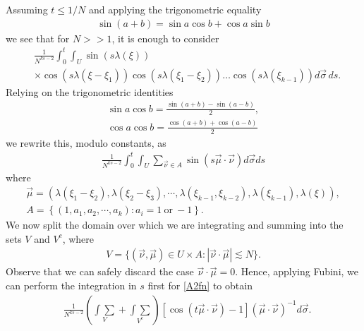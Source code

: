 \documentclass{amsart}
\begin{document}
Assuming $t \le 1/N$ and applying the trigonometric equality
\begin{equation*}
\begin{split}
\sin(a + b) = \sin a \cos b + \cos a \sin b
\end{split}
\end{equation*}
we see that for $N >> 1$, it is enough to consider
\begin{equation*}
\begin{split}
& \frac{1}{N^{ks-2}}\int_0^t 
\int_U
\sin(s\lambda(\xi))
\\
& \times 
\cos(s \lambda(\xi- \xi_{1}))
\cos(s \lambda(\xi_{1}- \xi_{2}))\dots\cos(s\lambda(\xi_{k-1}))
d \vec{\sigma}\,ds.
\end{split}
\end{equation*}
Relying on the trigonometric identities
\begin{gather*}
\sin a\cos b= \frac{\sin(a + b) - \sin(a-b)}{2},
\\
\cos a \cos b = \frac{\cos(a + b) + \cos(a-b)}{2}
\end{gather*}
we rewrite this, modulo constants, as
\begin{gather*}
  \frac{1}{N^{ks-2}} \int_{0}^{t}
  \int_{U}
\sum_{\vec{\nu} \in A}  \sin(s \vec{\mu} \cdot \vec{\nu}) d \vec{\sigma} ds
\end{gather*}
where
\begin{gather*}
  \vec{\mu} = \left ( \lambda(\xi_{1} - \xi_{2}), \lambda(\xi_{2} - \xi_{3}), \cdots, \lambda(\xi_{k-1}, \xi_{k-2}), \lambda(\xi_{k-1}), \lambda(\xi) \right ),
  \\
  A = \left \{ (1, a_{1}, a_{2}, \cdots, a_{k}): a_{i} = 1 \ \text{or} \ -1 \right \}.
\end{gather*}
We now split the domain over which we are integrating and summing into the sets $V$ and $V^{c}$, where
\begin{equation*}
\begin{split}
V = \{ ( \vec{\nu}, \vec{\mu} ) \in U \times A: |\vec{\nu} \cdot \vec{\mu} | \lesssim N \}.
\end{split}
\end{equation*}
Observe that we can safely discard the case $\vec{\nu} \cdot \vec{\mu} = 0$. Hence, applying Fubini, we can perform the integration in $s$ first for \eqref{A2fn} to obtain
\begin{equation}
  \begin{split}
    & \frac{1}{N^{ks-2}}  \left ( \underset{V}{\int \sum}
   + \underset{V^{c}}{\int \sum}  \right )
    [\cos(t \vec{\mu} \cdot \vec{\nu}) -1] (\vec{\mu} \cdot \vec{\nu})^{-1}
    d \vec{\sigma}.
     \end{split}
\end{equation}
\end{document}
